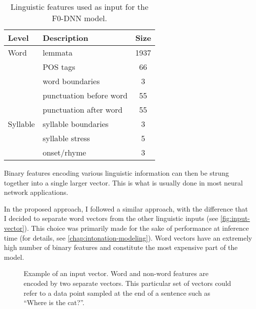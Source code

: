 \begin{table}[h!]
  \centering
  \begin{tabular}{llc}
    \toprule
    \textbf{Level} & \textbf{Description} & \textbf{Size} \\
    \midrule
    Word     & lemmata                 & 1937 \\
             & \acs{POS} tags          &   66 \\
             & word boundaries         &    3 \\
             & punctuation before word &   55 \\
             & punctuation after word  &   55 \\
    \midrule
    Syllable & syllable boundaries     &    3 \\
             & syllable stress         &    5 \\
             & onset/rhyme             &    3 \\
    \bottomrule
  \end{tabular}
    \caption[Intonation model textual features.]{Linguistic features used as input for the \acs{F0}-\acs{DNN} model.}
  \label{tab:ling-feat-f0}
\end{table}


Binary features encoding various linguistic information can then be strung together into a single larger vector.
This is what is usually done in most neural network applications.

In the proposed approach, I followed a similar approach, with the difference that I decided to separate word vectors from the other linguistic inputs (see \autoref{fig:input-vector}).
This choice was primarily made for the sake of performance at inference time (for details, see \autoref{chap:intonation-modeling}).
Word vectors have an extremely high number of binary features and constitute the most expensive part of the model.



\begin{figure}[H]
\centering
\scalebox{0.9}{}
\caption[Example of an input vector]{Example of an input vector.
Word and non-word features are encoded by two separate vectors.
This particular set of vectors could refer to a data point sampled at the end of a sentence such as ``Where is the cat?''.
}
\label{fig:input-vector}
\end{figure}
